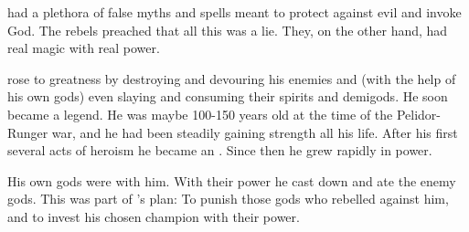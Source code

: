\Merkyrah had a plethora of false myths and spells meant to protect against evil and invoke God.
The rebels preached that all this was a lie. 
They, on the other hand, had real magic with real power.


\Narkiza rose to greatness by destroying and devouring his enemies and (with the help of his own gods) even slaying and consuming their spirits and demigods.
He soon became a legend. 
He was maybe 100-150 years old at the time of the Pelidor-Runger war, and he had been steadily gaining strength all his life. 
After his first several acts of heroism he became an \Ashenoch. 
Since then he grew rapidly in power.


His own gods were with him.
With their power he cast down and ate the enemy gods. 
This was part of \Secherdamon's plan: 
To punish those gods who rebelled against him, and to invest his chosen champion with their power.

